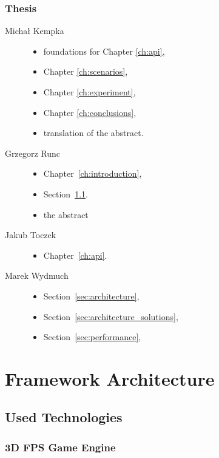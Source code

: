 \documentclass[english,bachelor,a4paper,twoside]{ppfcmthesis}
\begin{document}
	\subsection{Thesis}
	\begin{description}
		\item[Michał Kempka] \hfill
			\begin{itemize}
				\item foundations for Chapter \ref{ch:api},
				\item Chapter \ref{ch:scenarios},
				\item Chapter \ref{ch:experiment},
				\item Chapter \ref{ch:conclusions},
				\item translation of the abstract.
			\end{itemize}
		\item[Grzegorz Runc] \hfill
			\begin{itemize}
				\item Chapter~\ref{ch:introduction},
				\item Section~\ref{sec:technologies}.
                \item the abstract
			\end{itemize}
		\item[Jakub Toczek] \hfill
			\begin{itemize}
				\item Chapter~\ref{ch:api}.
			\end{itemize}
		\item[Marek Wydmuch] \hfill
			\begin{itemize}
				\item Section~\ref{sec:architecture},
				\item Section~\ref{sec:architecture_solutions},
				\item Section~\ref{sec:performance},
			\end{itemize}
	\end{description}

\chapter{Framework Architecture}
\label{ch:architecture}
\section{Used Technologies}
\label{sec:technologies}

\subsection{3D FPS Game Engine}
\end{document}
